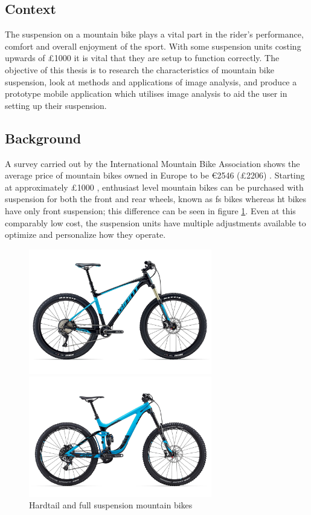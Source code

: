 \subsection{Context}
	The suspension on a mountain bike plays a vital part in the rider's performance, comfort and overall enjoyment of the sport. With some suspension units costing upwards of \pounds1000 it is vital that they are setup to function correctly. The objective of this thesis is to research the characteristics of mountain bike suspension, look at methods and applications of image analysis, and produce a prototype mobile application which utilises image analysis to aid the user in setting up their suspension.
\subsection{Background}
	A survey carried out by the International Mountain Bike Association shows the average price of mountain bikes owned in Europe to be \euro2546 (\pounds2206) \citep{imbasurv}. Starting at approximately \pounds1000 \citep{giantstance}, enthusiast level mountain bikes can be purchased with suspension for both the front and rear wheels, known as \gls{fs} bikes whereas \gls{ht} bikes have only front suspension; this difference can be seen in figure \ref{fig:fsandht}. Even at this comparably low cost, the suspension units have multiple adjustments available to optimize and personalize how they operate.
	\begin{figure}[h!]
		\centering
		\begin{minipage}{0.45\textwidth}
			\centering
			\includegraphics[width=8cm]{../images/2017_GIANT_FATHOM_1.jpg}
		\end{minipage}\hfill
		\begin{minipage}{0.45\textwidth}
			\centering
			\includegraphics[width=8cm]{../images/2016_Giant_Reign_Advanced_275_0.jpg}
		\end{minipage}
		\caption{Hardtail and full suspension mountain bikes \citep{giantfathom,giantreign}}
		\label{fig:fsandht}
	\end{figure}
